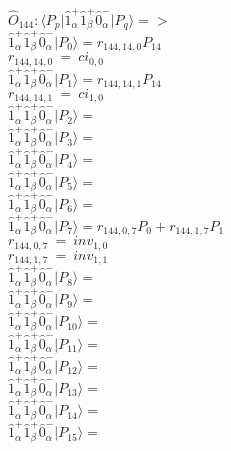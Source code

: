 \documentclass[14pt]{article}
\begin{document}
    $\hat{O}_{144}:  \langle{P_p}\vert \hat{1}_{\alpha}^{+}\hat{1}_{\beta}^{+}\hat{0}_{\alpha}^{-} \vert{P_q}\rangle => $ \\ 
    $ \hat{1}_{\alpha}^{+}\hat{1}_{\beta}^{+}\hat{0}_{\alpha}^{-} \vert{P_{0}}\rangle = {r}_{144,14,0}P_{14} $ \\ 
    ${r}_{144,14,0}\ =\ {ci}_{0,0} $ \\ 
    $ \hat{1}_{\alpha}^{+}\hat{1}_{\beta}^{+}\hat{0}_{\alpha}^{-} \vert{P_{1}}\rangle = {r}_{144,14,1}P_{14} $ \\ 
    ${r}_{144,14,1}\ =\ {ci}_{1,0} $ \\ 
    $ \hat{1}_{\alpha}^{+}\hat{1}_{\beta}^{+}\hat{0}_{\alpha}^{-} \vert{P_{2}}\rangle =  $ \\ 
    $ \hat{1}_{\alpha}^{+}\hat{1}_{\beta}^{+}\hat{0}_{\alpha}^{-} \vert{P_{3}}\rangle =  $ \\ 
    $ \hat{1}_{\alpha}^{+}\hat{1}_{\beta}^{+}\hat{0}_{\alpha}^{-} \vert{P_{4}}\rangle =  $ \\ 
    $ \hat{1}_{\alpha}^{+}\hat{1}_{\beta}^{+}\hat{0}_{\alpha}^{-} \vert{P_{5}}\rangle =  $ \\ 
    $ \hat{1}_{\alpha}^{+}\hat{1}_{\beta}^{+}\hat{0}_{\alpha}^{-} \vert{P_{6}}\rangle =  $ \\ 
    $ \hat{1}_{\alpha}^{+}\hat{1}_{\beta}^{+}\hat{0}_{\alpha}^{-} \vert{P_{7}}\rangle = {r}_{144,0,7}P_{0}+{r}_{144,1,7}P_{1} $ \\ 
    ${r}_{144,0,7}\ =\ {inv}_{1,0} $ \\ 
    ${r}_{144,1,7}\ =\ {inv}_{1,1} $ \\ 
    $ \hat{1}_{\alpha}^{+}\hat{1}_{\beta}^{+}\hat{0}_{\alpha}^{-} \vert{P_{8}}\rangle =  $ \\ 
    $ \hat{1}_{\alpha}^{+}\hat{1}_{\beta}^{+}\hat{0}_{\alpha}^{-} \vert{P_{9}}\rangle =  $ \\ 
    $ \hat{1}_{\alpha}^{+}\hat{1}_{\beta}^{+}\hat{0}_{\alpha}^{-} \vert{P_{10}}\rangle =  $ \\ 
    $ \hat{1}_{\alpha}^{+}\hat{1}_{\beta}^{+}\hat{0}_{\alpha}^{-} \vert{P_{11}}\rangle =  $ \\ 
    $ \hat{1}_{\alpha}^{+}\hat{1}_{\beta}^{+}\hat{0}_{\alpha}^{-} \vert{P_{12}}\rangle =  $ \\ 
    $ \hat{1}_{\alpha}^{+}\hat{1}_{\beta}^{+}\hat{0}_{\alpha}^{-} \vert{P_{13}}\rangle =  $ \\ 
    $ \hat{1}_{\alpha}^{+}\hat{1}_{\beta}^{+}\hat{0}_{\alpha}^{-} \vert{P_{14}}\rangle =  $ \\ 
    $ \hat{1}_{\alpha}^{+}\hat{1}_{\beta}^{+}\hat{0}_{\alpha}^{-} \vert{P_{15}}\rangle =  $ \\ 
    
\end{document}
